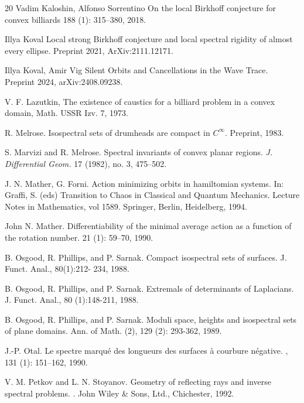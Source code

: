 \documentclass[12pt, openany]{amsart}
\theoremstyle{definition}
\theoremstyle{remark}
\theoremstyle{remark}
\theoremstyle{theorem}
\theoremstyle{theorem}
\theoremstyle{theorem}
\theoremstyle{theorem}
\begin{document}
\begin{thebibliography}{20}
Vadim Kaloshin, Alfonso Sorrentino
\newblock On the local Birkhoff conjecture for convex billiards
 188 (1): 315--380, 2018.


Illya Koval
\newblock Local strong Birkhoff conjecture and local spectral rigidity of almost every ellipse.
\newblock Preprint 2021, ArXiv:2111.12171.

Illya Koval, Amir Vig
\newblock Silent Orbits and Cancellations in the Wave Trace.
\newblock Preprint 2024, arXiv:2408.09238.

V. F. Lazutkin, The existence of caustics for a billiard problem in a convex domain, Math. USSR Izv. 7, 1973. 

R. Melrose. Isospectral sets of drumheads are compact in \( C^\infty \). Preprint, 1983.

S. Marvizi and R. Melrose.
Spectral invariants of convex planar regions.
{\em J. Differential Geom.} 17 (1982), no. 3, 475–502.

J. N. Mather, G. Forni. Action minimizing orbits in hamiltomian systems. In: Graffi, S. (eds) Transition to Chaos in Classical and Quantum Mechanics. Lecture Notes in Mathematics, vol 1589. Springer, Berlin, Heidelberg, 1994.

John N. Mather.
\newblock Differentiability of the minimal average action as a function of the rotation number. 
 21 (1): 59--70, 1990.


B. Osgood, R. Phillips, and P. Sarnak. Compact isospectral sets of surfaces. J. Funct. Anal., 80(1):212- 234, 1988.

B. Osgood, R. Phillips, and P. Sarnak. Extremals of determinants of Laplacians. J. Funct. Anal., 80 (1):148-211, 1988.

B. Osgood, R. Phillips, and P. Sarnak. Moduli space, heights and isospectral sets of plane domains. Ann. of Math. (2), 129 (2): 293-362, 1989.

J.-P. Otal. 
\newblock Le spectre marqu\'e des longueurs des surfaces \`a courbure n\'egative. 
, 131 (1): 151--162, 1990.



V. M. Petkov and L. N. Stoyanov. 
\newblock Geometry of reflecting rays and inverse spectral problems.
. John Wiley \& Sons, Ltd., Chichester, 1992.


\end{thebibliography}
\end{document}
